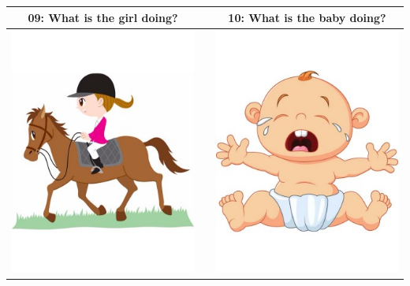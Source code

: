 \documentclass[12pt,notitlepage]{article}
\begin{document}
\begin{center}
\begin{tabular}{|c|c|c|}
\hline
09: What is the girl doing? && 10: What is the baby doing? \\
\hline
\includegraphics[width=20em,trim=0 0 0 -3]{figures/I09.jpg} & & \includegraphics[width=20em,trim=0 0 0 -3]{figures/I10.jpg} \\
\hline
\end{tabular}
\vspace{1em} \\



\end{center}
\end{document}
